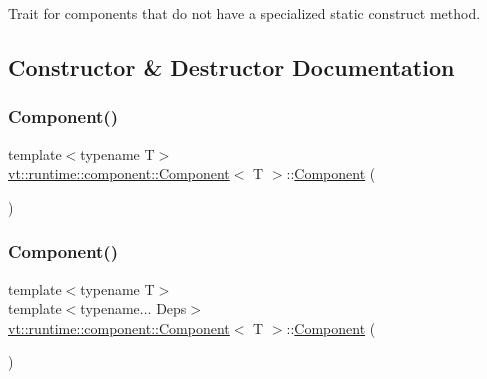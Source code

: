 Trait for components that do not have a specialized static construct method. 



\subsection{Constructor \& Destructor Documentation}
\mbox{\label{structvt_1_1runtime_1_1component_1_1_component_ab954824329584814bb652ea810cd62e3}} 
\subsubsection{\texorpdfstring{Component()}{Component()}\hspace{0.1cm}{\footnotesize\ttfamily [1/2]}}
{\footnotesize\ttfamily template$<$typename T$>$ \\
\hyperlink{structvt_1_1runtime_1_1component_1_1_component}{vt\+::runtime\+::component\+::\+Component}$<$ T $>$\+::\hyperlink{structvt_1_1runtime_1_1component_1_1_component}{Component} (\begin{DoxyParamCaption}{ }\end{DoxyParamCaption})\hspace{0.3cm}{\ttfamily [default]}}

\mbox{\label{structvt_1_1runtime_1_1component_1_1_component_a1a94c1d493860adff6ae69c5eb31bb3f}} 
\subsubsection{\texorpdfstring{Component()}{Component()}\hspace{0.1cm}{\footnotesize\ttfamily [2/2]}}
{\footnotesize\ttfamily template$<$typename T$>$ \\
template$<$typename... Deps$>$ \\
\hyperlink{structvt_1_1runtime_1_1component_1_1_component}{vt\+::runtime\+::component\+::\+Component}$<$ T $>$\+::\hyperlink{structvt_1_1runtime_1_1component_1_1_component}{Component} (\begin{DoxyParamCaption}\item[{\hyperlink{structvt_1_1runtime_1_1component_1_1_base_component_1_1_deps_pack}{Deps\+Pack}$<$ Deps... $>$}]{ }\end{DoxyParamCaption})\hspace{0.3cm}{\ttfamily [inline]}}



